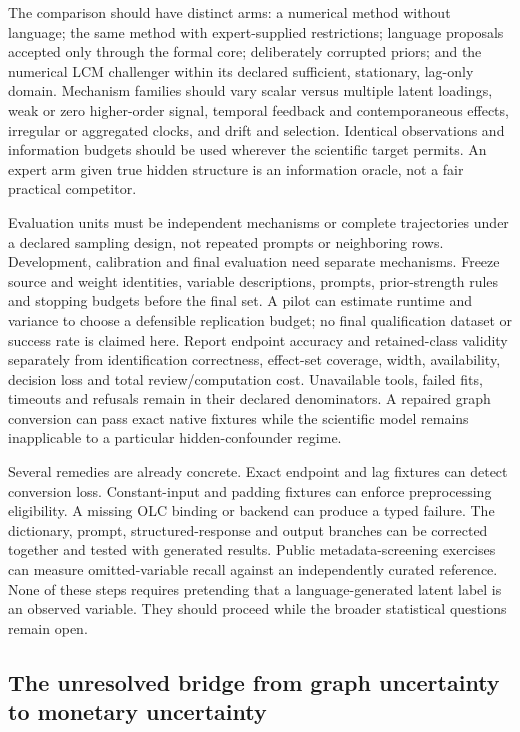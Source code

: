 The comparison should have distinct arms: a numerical method without
language; the same method with expert-supplied restrictions; language
proposals accepted only through the formal core; deliberately corrupted
priors; and the numerical LCM challenger within its declared sufficient,
stationary, lag-only domain. Mechanism families should vary scalar versus
multiple latent loadings, weak or zero higher-order signal, temporal
feedback and contemporaneous effects, irregular or aggregated clocks, and
drift and selection. Identical observations and information budgets should
be used wherever the scientific target permits. An expert arm given true
hidden structure is an information oracle, not a fair practical competitor.
\citep{exec15_latent_design}

Evaluation units must be independent mechanisms or complete trajectories
under a declared sampling design, not repeated prompts or neighboring rows.
Development, calibration and final evaluation need separate mechanisms.
Freeze source and weight identities, variable descriptions, prompts,
prior-strength rules and stopping budgets before the final set. A pilot can
estimate runtime and variance to choose a defensible replication budget;
no final qualification dataset or success rate is claimed here. Report
endpoint accuracy and retained-class validity separately from identification
correctness, effect-set coverage, width, availability, decision loss and
total review/computation cost. Unavailable tools, failed fits, timeouts and
refusals remain in their declared denominators. A repaired graph conversion
can pass exact native fixtures while the scientific model remains
inapplicable to a particular hidden-confounder regime.
\citep{exec15_latent_design}

Several remedies are already concrete. Exact endpoint and lag fixtures can
detect conversion loss. Constant-input and padding fixtures can enforce
preprocessing eligibility. A missing OLC binding or backend can produce a
typed failure. The dictionary, prompt, structured-response and output
branches can be corrected together and tested with generated results.
Public metadata-screening exercises can measure omitted-variable recall
against an independently curated reference. None of these steps requires
pretending that a language-generated latent label is an observed variable.
They should proceed while the broader statistical questions remain open.
\citep{exec15_latent_design}

\subsection{The unresolved bridge from graph uncertainty to monetary uncertainty}

